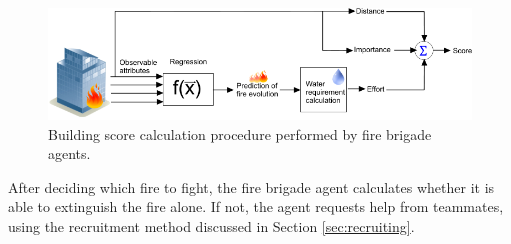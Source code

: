\begin{figure}[!ht]
     \centering
     \includegraphics[width=12cm]{img/firebrigade.png}
     \caption{Building score calculation procedure performed by fire brigade agents.}
     \label{fig:firebrigade}
\end{figure}


After deciding which fire to fight, the fire brigade agent calculates whether it is able to extinguish the fire alone. If not, the agent requests help from teammates, using the recruitment method discussed in Section \ref{sec:recruiting}.
